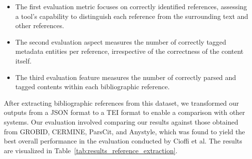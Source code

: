 \begin{itemize}
    \item The first evaluation metric focuses on correctly identified references, assessing a tool's capability to distinguish each reference from the surrounding text and other references.
    \item The second evaluation aspect measures the number of correctly tagged metadata entities per reference, irrespective of the correctness of the content itself.
    \item The third evaluation feature measures the number of correctly parsed and tagged contents within each bibliographic reference.
\end{itemize}

After extracting bibliographic references from this dataset, we transformed our outputs from a JSON format to a TEI format to enable a comparison with other systems. Our evaluation involved comparing our results against those obtained from GROBID, CERMINE, ParsCit, and Anystyle, which was found to yield the best overall performance in the evaluation conducted by Cioffi et al. The results are visualized in Table~\ref{tab:results_reference_extraction}.


